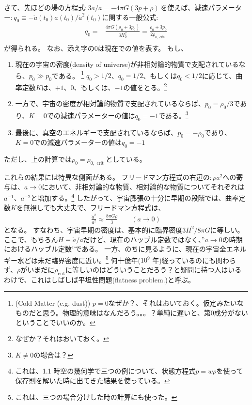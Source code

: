 \documentclass[11pt]{ltjsarticle}
\theoremstyle{plain}
\theoremstyle{break}
\begin{document}
さて、先ほどの場の方程式$:3\ddot{a}/{a}=-4 \pi G(3 p+\rho)\,$を使えば、減速パラメーター$:q_{0} \equiv-\ddot{a}\left(t_{0}\right) a\left(t_{0}\right) / \dot{a}^{2}\left(t_{0}\right)$に関する一般公式:
\begin{align}
  q_{0}
    =&\frac{4 \pi G\left(\rho_{0}+3 p_{0}\right)}{3 H_{0}^{2}}=\frac{\rho_{0}+3 p_{0}}{2 \rho_{0, \text { crit }}}  \\
\end{align}%
が得られる。
なお、添え字の$0$は現在での値を表す。
もし、
\begin{enumerate}
\item 現在の宇宙の密度(density of universe)が非相対論的物質で支配されているなら、$p_0 \gg p_0$である。 
\footnote{(Cold Matter (e.g. dust)) $p=0$なぜか？、それはおいておく。仮定みたいなものだと思う。物理的意味はなんだろう。。。？単純に遅いと、第0成分がないということでいいのか。}
$q_0 > 1/2$、$q_0 = 1/2$、もしくは$q_0 < 1/2$に応じて、曲率定数$K$は、$+1$、$0$、もしくは、$-1$の値をとる。\footnote{なぜか？それはおいておく。}

\item 一方で、宇宙の密度が相対論的物質で支配されているならば、$p_0 = \rho_0 /3$であり、$K=0$での減速パラメーターの値は$q_0 = -1$である。\footnote{$K \neq 0 $の場合は？}

\item 最後に、真空のエネルギーで支配されているならば、$p_0 = - \rho_0$であり、$K=0$での減速パラメーターの値は$q_0 =-1$
\end{enumerate}
ただし、上の計算では$\rho_0 = \rho_{0, \text{ crit }}$としている。

これらの結果には特異な側面がある。
フリードマン方程式の右辺の$:\rho a^2$への寄与は、$a \to 0$において、非相対論的な物質、相対論的な物質についてそれぞれは$a^{-1}$、$a^{-2}$と増加する。\footnote{これは、1.1 時空の幾何学で三つの例について、状態方程式$p=w \rho$を使って保存則を解いた時に出てきた結果を使っている。}
したがって、宇宙膨張の十分に早期の段階では、曲率定数$K$を無視しても大丈夫で、フリードマン方程式は、
\begin{align}
  \frac{\dot{a}^2}{a^2}  \approx \frac{8 \pi G \rho}{3} \qquad (a \to 0)
\end{align}%
となる。
すなわち、宇宙早期の密度は、基本的に臨界密度$3H^2/8\pi G$に等しい。
ここで、もちろん$H \equiv \dot{a} / a$だけど、現在のハッブル定数ではなく、”$a\to 0 $の時期におけるハッブル定数”である。
一方、のちに見るように、現在の宇宙全エネルギー水どは未だ臨界密度に近い。\footnote{これは、三つの場合分けした時の計算にも使った。}
何十億年($10^9$ 年)経っているのにも関わらず、$\rho$がいまだに$\rho_{\text{crit}}$に等しいのはどういうことだろう？と疑問に持つ人はいるわけで、これはしばしば平坦性問題(flatness problem.)と呼ぶ。
\end{document}
